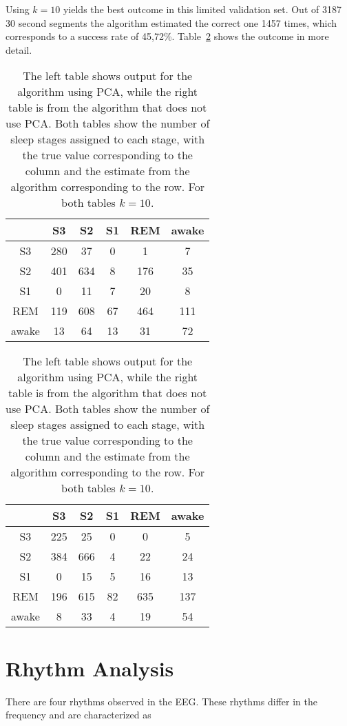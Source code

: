 Using $k=10$ yields the best outcome in this limited validation set. Out of 3187 30 second segments the algorithm estimated the correct one 1457 times, which corresponds to a success rate of 45,72\%. Table~\ref{tab:error_validation} shows the outcome in more detail.

\begin{table}
	\centering
	\begin{subtable}{0.48\textwidth}
		\begin{tabular}{c|ccccc}
			    & S3  & S2  & S1 & REM & awake \\
			\hline
			S3 & 280  & 37  & 0  & 1  & 7 \\
			S2 & 401  & 634  & 8  & 176  & 35 \\
			S1 & 0  & 11  & 7  & 20  & 8 \\
			REM & 119  & 608  & 67  & 464  & 111 \\
			awake & 13  & 64  & 13  & 31  & 72 \\
		\end{tabular}
	\end{subtable}
	\hfill
	\begin{subtable}{0.48\textwidth}
		\begin{tabular}{c|ccccc}
			   & S3  & S2  & S1 & REM & awake \\
			\hline
			S3 & 225  & 25  & 0  & 0  & 5 \\
			S2 & 384  & 666  & 4  & 22  & 24 \\
			S1 & 0  & 15  & 5  & 16  & 13 \\
			REM & 196  & 615  & 82  & 635  & 137 \\
			awake & 8  & 33  & 4  & 19  & 54 \\
		\end{tabular}
	\end{subtable}
	
	\caption{The left table shows output for the algorithm using PCA, while the right table is from the algorithm that does not use PCA. Both tables show the number of sleep stages assigned to each stage, with the true value corresponding to the column and the estimate from the algorithm corresponding to the row. For both tables $k=10$.}
	\label{tab:error_validation}
\end{table}


\section{Rhythm Analysis}
There are four rhythms observed in the EEG\cite[chapter~11]{Ganong1997}. These rhythms differ in the frequency and are characterized as

